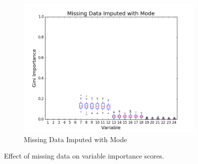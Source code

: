 \begin{figure}[H]
\begin{subfigure}[b]{0.45\textwidth}
    \includegraphics[width=\textwidth]{figures/random_forests/rf_missing_data_imputed_mode}
    \caption{Missing Data Imputed with Mode}
    \label{fig:missing-data-imputed}
  \end{subfigure}
  \caption{Effect of missing data on variable importance scores.}
  \label{fig:missing-data}
\end{figure}


